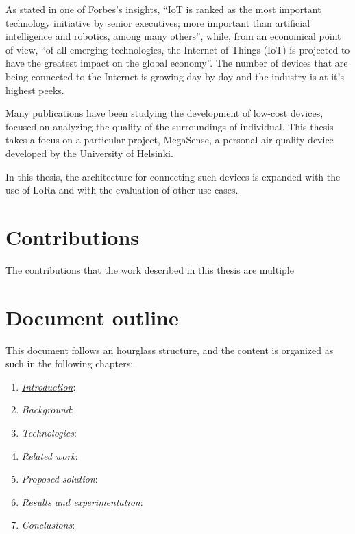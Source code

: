 	As stated in one of Forbes's insights, ``IoT is ranked as the most important technology initiative by senior executives; more important than artificial intelligence and robotics, among many others'', while, from an economical point of view, ``of all emerging technologies, the Internet of Things (IoT) is projected to have the greatest impact on the global economy''\cite{forbes}.
	The number of devices that are being connected to the Internet is growing day by day and the industry is at it's highest peeks.

	Many publications have been studying the development of low-cost devices, focused on analyzing the quality of the surroundings of individual. 
	This thesis takes a focus on a particular project, MegaSense, a personal air quality device developed by the University of Helsinki.
	
	In this thesis, the architecture for connecting such devices is expanded with the use of LoRa and with the evaluation of other use cases.
	
	
	\section{Contributions}\label{sec:contributions}
	
		The contributions that the work described in this thesis are multiple
		
	
	\section{Document outline}\label{sec:document_outline}
		
		This document follows an hourglass structure, and the content is organized as such in the following chapters:
		
		\begin{enumerate}
			
			\item \hyperref[chapter:introduction]{\textit{Introduction}}:
			\item \textit{Background}:
			\item \textit{Technologies}:
			\item \textit{Related work}:
			\item \textit{Proposed solution}:
			\item \textit{Results and experimentation}:
			\item \textit{Conclusions}:
			
		\end{enumerate}